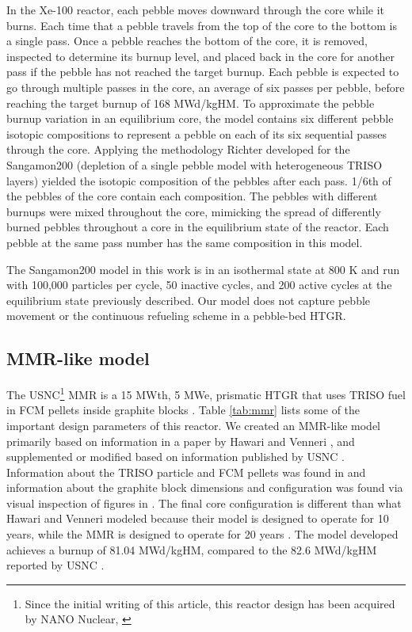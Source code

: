 In the Xe-100 reactor, each pebble moves downward through the
core while it burns. Each 
time that a pebble travels from the top of the core to the bottom is a single 
pass. Once a pebble reaches the bottom of the core, it is removed, 
inspected to determine its burnup level, and placed back in 
the core for another pass if the pebble has 
not reached the target burnup. Each pebble is expected to 
go through multiple passes in the core, an average 
of six passes per pebble, before reaching the target burnup of 168 
MWd/kgHM. To approximate the pebble burnup variation in an 
equilibrium core, the model contains
six different pebble isotopic compositions to  
represent a pebble on each of its six sequential passes through 
the core. 
Applying the methodology 
Richter developed for the Sangamon200 
\cite{richter_isotopic_2022} (depletion of a single pebble model 
with heterogeneous \gls*{TRISO} layers) yielded the isotopic 
composition of the pebbles after each pass.
1/6th of the pebbles of the core contain each composition. 
The pebbles with different burnups 
were mixed throughout the core, mimicking the spread of 
differently burned pebbles throughout a core in the equilibrium state 
of the reactor. Each pebble at the same pass number has the same 
composition in this model.   

The Sangamon200 model in this work is in an isothermal state 
at 800 K and run 
with 100,000 particles per cycle, 50 inactive cycles, 
and 200 active cycles at the equilibrium state previously described. 
Our model does not capture pebble movement or the continuous 
refueling scheme in a pebble-bed \gls*{HTGR}. 

\subsection{MMR-like model}
The \gls*{USNC}\footnote{Since the initial writing of 
this article, this reactor design has been acquired by NANO Nuclear, 
\cite{noauthor_nano_2025}} \gls*{MMR} is a 15 MWth, 5 MWe, prismatic \gls*{HTGR} that 
uses \gls*{TRISO} fuel in \gls*{FCM} pellets inside graphite blocks 
\cite{noauthor_usnc_2021}. Table \ref{tab:mmr} lists some of the important 
design parameters of this reactor.
We created an \gls*{MMR}-like model primarily based on information in 
a paper by Hawari and Venneri
\cite{hawari_development_2018}, and supplemented or modified based on 
information published by \gls*{USNC} \cite{noauthor_usnc_2021,venneri_micro_2019}. 
Information about the \gls*{TRISO} 
particle and \gls*{FCM} pellets was found in \cite{noauthor_usnc_2021}
and information about the graphite block dimensions and configuration 
was found via visual inspection of figures in \cite{venneri_micro_2019}. 
The final core configuration 
is different than what Hawari and Venneri modeled \cite{hawari_development_2018} 
because their model is designed to operate 
for 10 years, while the \gls*{MMR} is designed to operate for 20 years 
\cite{noauthor_usnc_2021}. The model developed achieves a burnup 
of 81.04 MWd/kgHM, compared to the 82.6 MWd/kgHM reported by 
\gls*{USNC} \cite{noauthor_usnc_2021}.

